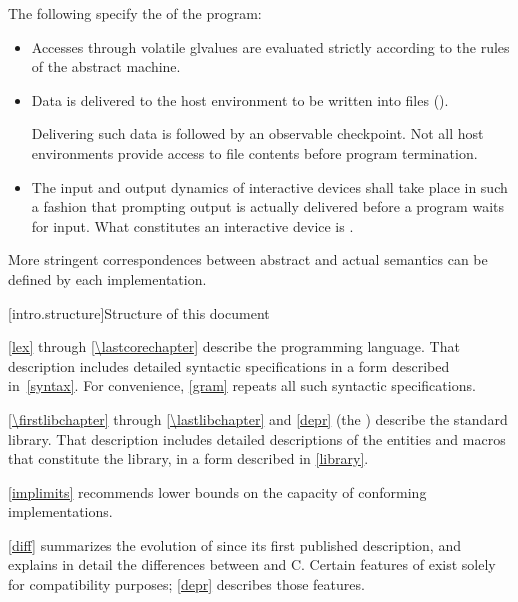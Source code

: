 \pnum
{}%
The following specify the
of the program:
\begin{itemize}
\item
Accesses through volatile glvalues are evaluated strictly according to the
rules of the abstract machine.
\item
Data is delivered to the host environment to be written into files ().

\begin{note}
Delivering such data
is followed by an observable checkpoint.
Not all host environments provide access to file contents before program termination.
\end{note}

\item
The input and output dynamics of interactive devices shall take
place in such a fashion that prompting output is actually delivered before a program waits for input. What constitutes an interactive device is
.
\end{itemize}

\begin{note}
More stringent correspondences between abstract and actual
semantics can be defined by each implementation.
\end{note}
%

[intro.structure]{Structure of this document}

\pnum
{}%
%
\ref{lex} through \ref{\lastcorechapter} describe the \Cpp{} programming
language. That description includes detailed syntactic specifications in
a form described in~\ref{syntax}. For convenience, \ref{gram}
repeats all such syntactic specifications.

\pnum
\ref{\firstlibchapter} through \ref{\lastlibchapter} and \ref{depr}
(the ) describe the \Cpp{} standard library.
That description includes detailed descriptions of the
entities and macros
that constitute the library, in a form described in \ref{library}.

\pnum
\ref{implimits} recommends lower bounds on the capacity of conforming
implementations.

\pnum
\ref{diff} summarizes the evolution of \Cpp{} since its first
published description, and explains in detail the differences between
\Cpp{} and C\@. Certain features of \Cpp{} exist solely for compatibility
purposes; \ref{depr} describes those features.

